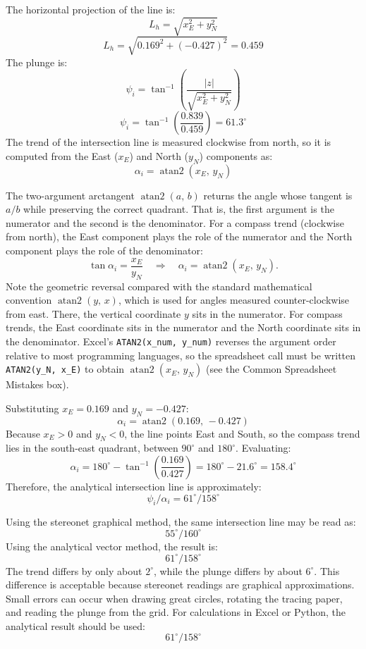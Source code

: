 \documentclass[a4paper,12pt]{article}
\begin{document}
\begin{calcbox}
The horizontal projection of the line is:
\[
L_h = \sqrt{x_E^2+y_N^2}
\]
\[
L_h =
\sqrt{0.169^2+(-0.427)^2}
=
0.459
\]
The plunge is:
\[
\psi_i =
\tan^{-1}
\left(
\frac{|z|}{\sqrt{x_E^2+y_N^2}}
\right)
\]
\[
\psi_i =
\tan^{-1}
\left(
\frac{0.839}{0.459}
\right)
=
61.3^\circ
\]
The trend of the intersection line is measured clockwise from north,
so it is computed from the East ($x_E$) and North ($y_N$) components as:
\[
\alpha_i = \operatorname{atan2}(x_E,\, y_N)
\]
\begin{notebox}
The two-argument arctangent $\operatorname{atan2}(a,\, b)$ returns the angle
whose tangent is $a/b$ while preserving the correct quadrant.
That is, the first argument is the numerator and the second is the denominator.
\vspace{1.0 em}
For a compass trend (clockwise from north), the East component plays the role
of the numerator and the North component plays the role of the denominator:
\[
\tan\alpha_i = \frac{x_E}{y_N}
\quad\Longrightarrow\quad
\alpha_i = \operatorname{atan2}(x_E,\, y_N).
\]
Note the geometric reversal compared with the standard mathematical convention
$\operatorname{atan2}(y,\, x)$, which is used for angles measured
counter-clockwise from east. There, the vertical coordinate $y$ sits in the
numerator. For compass trends, the East coordinate sits in the numerator and
the North coordinate sits in the denominator.
\vspace{1.0 em}
Excel's \texttt{ATAN2(x\_num, y\_num)} reverses the argument order relative to
most programming languages, so the spreadsheet call must be written
\texttt{ATAN2(y\_N, x\_E)} to obtain $\operatorname{atan2}(x_E,\, y_N)$
(see the Common Spreadsheet Mistakes box).
\end{notebox}
Substituting $x_E = 0.169$ and $y_N = -0.427$:
\[
\alpha_i = \operatorname{atan2}(0.169,\, -0.427)
\]
Because $x_E > 0$ and $y_N < 0$, the line points East and South,
so the compass trend lies in the south-east quadrant, between $90^\circ$ and $180^\circ$.
Evaluating:
\[
\alpha_i = 180^\circ - \tan^{-1}\!\left(\frac{0.169}{0.427}\right)
= 180^\circ - 21.6^\circ = 158.4^\circ
\]
Therefore, the analytical intersection line is approximately:
\[
\boxed{\psi_i/\alpha_i = 61^\circ/158^\circ}
\]
\end{calcbox}
\begin{notebox}
Using the stereonet graphical method, the same intersection line may be read as:
\[
\boxed{55^\circ/160^\circ}
\]
Using the analytical vector method, the result is:
\[
\boxed{61^\circ/158^\circ}
\]
The trend differs by only about $2^\circ$, while the plunge differs by about $6^\circ$.
This difference is acceptable because stereonet readings are graphical approximations. Small errors can occur when drawing great circles, rotating the tracing paper, and reading the plunge from the grid.
\vspace{1.0 em}
For calculations in Excel or Python, the analytical result should be used:
\[
\boxed{61^\circ/158^\circ}
\]
\end{notebox}
\end{document}
